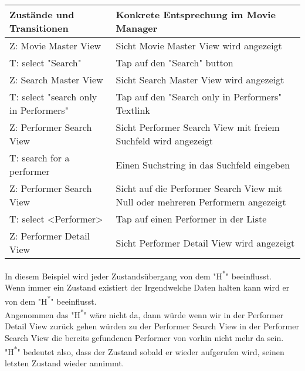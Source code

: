 \documentclass{article}
\begin{document}
\begin{tabularx}{\linewidth}{XX}
\toprule
{\Large \textbf{Zustände und Transitionen}} & {\Large \textbf{Konkrete Entsprechung im Movie Manager}} \\ \midrule

Z: Movie Master View & Sicht Movie Master View wird angezeigt \\
T: select "Search" & Tap auf den "Search" button \\
Z: Search Master View & Sicht Search Master View wird angezeigt \\
T: select "search only in Performers" & Tap auf den "Search only in Performers" Textlink \\
Z: Performer Search View & Sicht Performer Search View mit freiem Suchfeld wird angezeigt\\
T: search for a performer & Einen Suchstring in das Suchfeld eingeben \\
Z: Performer Search View & Sicht auf die Performer Search View mit Null oder mehreren Performern angezeigt\\
T: select \textless Performer\textgreater & Tap auf einen Performer in der Liste\\
Z: Performer Detail View & Sicht Performer Detail View wird angezeigt \\
\bottomrule

\end{tabularx}
In diesem Beispiel wird jeder Zustandsübergang von dem "H\textsuperscript{*}" beeinflusst.\\
Wenn immer ein Zustand existiert der Irgendwelche Daten halten kann wird er von dem "H\textsuperscript{*}" beeinflusst.\\
Angenommen das "H\textsuperscript{*}" wäre nicht da, dann würde wenn wir in der Performer Detail View zurück
gehen würden zu der Performer Search View in der Performer Search View die bereits gefundenen Performer von vorhin
nicht mehr da sein.\\
"H\textsuperscript{*}" bedeutet also, dass der Zustand sobald er wieder aufgerufen wird, seinen letzten Zustand wieder annimmt.
\end{document}
